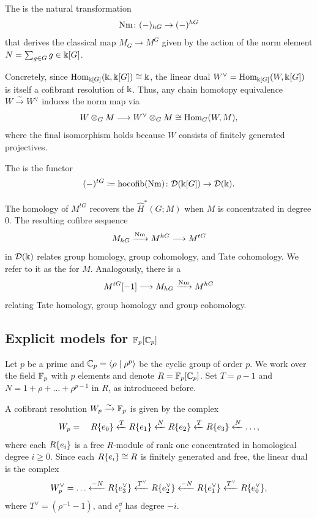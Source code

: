 \begin{definition}
	The  is the natural transformation
	\[
	\mathrm{Nm} \colon (-)_{hG} \to (-)^{hG}
	\]
	that derives the classical map \(M_G \to M^G\) given by the action of the norm element \(N = \sum_{g \in G} g \in \Bbbk[G]\).
\end{definition}

Concretely, since \(\mathrm{Hom}_{\Bbbk[G]}(\Bbbk,\Bbbk[G]) \cong \Bbbk\), the linear dual \(W^\vee = \mathrm{Hom}_{\Bbbk[G]}(W,\Bbbk[G])\) is itself a cofibrant resolution of \(\Bbbk\).
Thus, any chain homotopy equivalence \(W \xrightarrow{\sim} W^\vee\) induces the norm map via
\[
W \otimes_G M \longrightarrow W^\vee \otimes_G M \cong \mathrm{Hom}_G(W,M),
\]
where the final isomorphism holds because \(W\) consists of finitely generated projectives.

\begin{definition}
	The  is the functor
	\[
	(-)^{tG} \coloneqq \operatorname{hocofib}(\mathrm{Nm}) \colon \mathcal D(\Bbbk[G]) \to \mathcal D(\Bbbk).
	\]
\end{definition}

The homology of \(M^{tG}\) recovers the  \(\widehat H^*(G;M)\) when \(M\) is concentrated in degree \(0\).
The resulting cofibre sequence
\[
M_{hG} \xrightarrow{\mathrm{Nm}} M^{hG} \longrightarrow M^{tG}
\]
in \(\mathcal D(\Bbbk)\) relates group homology, group cohomology, and Tate cohomology.
We refer to it as the  for \(M\).
Analogously, there is a 
\[
M^{tG}[-1] \longrightarrow M_{hG} \xrightarrow{\mathrm{Nm}} M^{hG}
\]
relating Tate homology, group homology and group cohomology.

\subsection{Explicit models for \({\mathbb{F}_p}[\mathbb{C}_p]\)}

Let \(p\) be a prime and \(\mathbb{C}_p = \langle\rho \mid \rho^p\rangle\) be the cyclic group of order \(p\).
We work over the field \({\mathbb{F}_p}\) with \(p\) elements and denote \(R = {\mathbb{F}_p}[\mathbb{C}_p]\).
Set \(T = \rho - 1\) and \(N = 1 + \rho + \dots + \rho^{p-1}\) in \(R\), as introduceed before.

A cofibrant resolution \(W_p \xrightarrow{\sim} {\mathbb{F}_p}\) is given by the complex
\[
W_p = \quad R\{e_0\} \xleftarrow{T} R\{e_1\} \xleftarrow{N} R\{e_2\} \xleftarrow{T} R\{e_3\} \xleftarrow{N} \dots,
\]
where each \(R\{e_i\}\) is a free \(R\)-module of rank one concentrated in homological degree \(i \geq 0\).
Since each \(R\{e_i\} \cong R\) is finitely generated and free, the linear dual is the complex
\[
W^\vee_p = \dots \xleftarrow{-N} R\{e_3^\vee\} \xleftarrow{T^\vee} R\{e_2^\vee\} \xleftarrow{-N} R\{e_1^\vee\} \xleftarrow{T^\vee} R\{e_0^\vee\},
\]
where \(T^\vee = (\rho^{-1}-1)\), and \(e_i^\dd\) has degree \(-i\).

